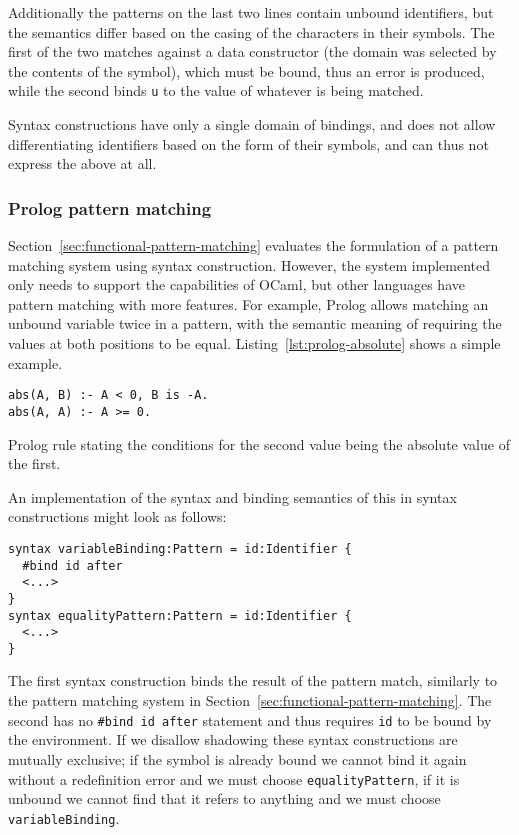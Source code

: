 \documentclass{kththesis}
\begin{document}
Additionally the patterns on the last two lines contain unbound identifiers, but the semantics differ based on the casing of the characters in their symbols. The first of the two matches against a data constructor (the domain was selected by the contents of the symbol), which must be bound, thus an error is produced, while the second binds \texttt{u} to the value of whatever is being matched.

Syntax constructions have only a single domain of bindings, and does not allow differentiating identifiers based on the form of their symbols, and can thus not express the above at all.

\subsubsection{Prolog pattern matching}

Section~\ref{sec:functional-pattern-matching} evaluates the formulation of a pattern matching system using syntax construction. However, the system implemented only needs to support the capabilities of OCaml, but other languages have pattern matching with more features. For example, Prolog allows matching an unbound variable twice in a pattern, with the semantic meaning of requiring the values at both positions to be equal. Listing~\ref{lst:prolog-absolute} shows a simple example.

\begin{listing}[h]
\begin{verbatim}
abs(A, B) :- A < 0, B is -A.
abs(A, A) :- A >= 0.
\end{verbatim}
\caption{Prolog rule stating the conditions for the second value being the absolute value of the first.}
\label{lst:prolog-absolute}
\end{listing}

An implementation of the syntax and binding semantics of this in syntax constructions might look as follows:

\begin{verbatim}
syntax variableBinding:Pattern = id:Identifier {
  #bind id after
  <...>
}
syntax equalityPattern:Pattern = id:Identifier {
  <...>
}
\end{verbatim}

The first syntax construction binds the result of the pattern match, similarly to the pattern matching system in Section~\ref{sec:functional-pattern-matching}. The second has no \texttt{#bind id after} statement and thus requires \texttt{id} to be bound by the environment. If we disallow shadowing these syntax constructions are mutually exclusive; if the symbol is already bound we cannot bind it again without a redefinition error and we must choose \texttt{equalityPattern}, if it is unbound we cannot find that it refers to anything and we must choose \texttt{variableBinding}.
\end{document}
